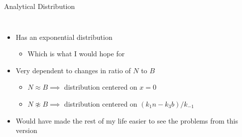 \documentclass[aspectratio=169, onlytextwidth,  notheorems, sOuRcEs, fleqn, leqno, ]{RUCPresentation}
\begin{document}
\begin{frame}{ Analytical Distribution }

    \begin{columns}

        \column{0.60\framewidth}

        \begin{itemize}
            \item Has an exponential distribution
                \begin{itemize}
                    \item Which is what I would hope for
                \end{itemize}
            \item Very dependent to changes in ratio of \(N\) to \(B\)
                \begin{itemize}
                    \item \(N \approx  B \implies\) distribution centered on \(x=0\)
                    \item \(N \not\approx B \implies\) distribution centered on \( (k_1n - k_3b) / k_{-1}\)
                \end{itemize}
            \item Would have made the rest of my life easier to see the
                problems from this version
        \end{itemize}

        \column{0.6\framewidth}

    \end{columns}


\end{frame}
\end{document}
